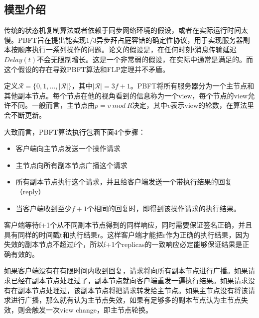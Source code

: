 \subsection{模型介绍}
传统的状态机复制算法或者依赖于同步网络环境的假设，或者在实际运行时间太慢。PBFT旨在提出能实现$1/3$异步拜占庭容错的确定性协议，用于实现服务器副本按顺序执行一系列操作的问题。论文的假设是，在任何时刻$t$消息传输延迟$Delay(t)$不会无限制增长。这是一个非常弱的假设，在实际中通常是满足的。而这个假设的存在导致PBFT算法和FLP定理并不矛盾。

定义$\mathcal{R}=\{0,1,...,|\mathcal{R}|\}$，其中$|\mathcal{R}|=3f+1$。PBFT将所有服务器分为一个主节点和其他副本节点。每个节点在他的视角看到的信息称为一个view，每个节点的view允许不同。一般而言，主节点由$p=v~mod~R$决定，其中$v$表示view的轮数，在算法里会不断更新。

大致而言，PBFT算法执行包涵下面4个步骤：
\begin{itemize}
	\item 客户端向主节点发送一个操作请求
    \item 主节点向所有副本节点广播这个请求
    \item 所有副本节点执行这个请求，并且给客户端发送一个带执行结果的回复（reply）
    \item 当客户端收到至少$f+1$个相同的回复时，即得到该操作请求的执行结果。
\end{itemize}

客户端等待f+1个从不同副本节点得到的同样响应，同时需要保证签名正确，并且具有同样的时间戳t和执行结果r。这样客户端才能把r作为正确的执行结果，因为失效的副本节点不超过f个，所以f+1个replicas的一致响应必定能够保证结果是正确有效的。

如果客户端没有在有限时间内收到回复，请求将向所有副本节点进行广播。如果请求已经在副本节点处理过了，副本节点就向客户端重发一遍执行结果。如果请求没有在副本节点处理过，该副本节点将把请求转发给主节点。如果主节点没有将该请求进行广播，那么就有认为主节点失效，如果有足够多的副本节点认为主节点失效，则会触发一次view change，即主节点轮换。

